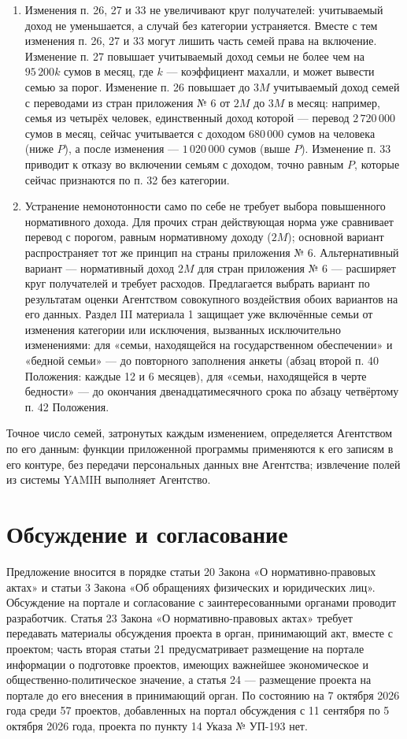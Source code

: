\documentclass[14pt,a4paper]{extarticle}
\begin{document}
\begin{enumerate}[leftmargin=1.27cm]
\item Изменения п. 26, 27 и 33 не увеличивают круг получателей: учитываемый доход не уменьшается, а случай без категории устраняется. Вместе с тем изменения п. 26, 27 и 33 могут лишить часть семей права на включение. Изменение п. 27 повышает учитываемый доход семьи не более чем на $95\,200k$ сумов в месяц, где $k$ — коэффициент махалли, и может вывести семью за порог. Изменение п. 26 повышает до $3M$ учитываемый доход семей с переводами из стран приложения № 6 от $2M$ до $3M$ в месяц: например, семья из четырёх человек, единственный доход которой — перевод $2\,720\,000$ сумов в месяц, сейчас учитывается с доходом $680\,000$ сумов на человека (ниже $P$), а после изменения — $1\,020\,000$ сумов (выше $P$). Изменение п. 33 приводит к отказу во включении семьям с доходом, точно равным $P$, которые сейчас признаются по п. 32 без категории.
\item Устранение немонотонности само по себе не требует выбора повышенного нормативного дохода. Для прочих стран действующая норма уже сравнивает перевод с порогом, равным нормативному доходу ($2M$); основной вариант распространяет тот же принцип на страны приложения № 6. Альтернативный вариант — нормативный доход $2M$ для стран приложения № 6 — расширяет круг получателей и требует расходов. Предлагается выбрать вариант по результатам оценки Агентством совокупного воздействия обоих вариантов на его данных. Раздел III материала 1 защищает уже включённые семьи от изменения категории или исключения, вызванных исключительно изменениями: для «семьи, находящейся на государственном обеспечении» и «бедной семьи» — до повторного заполнения анкеты (абзац второй п. 40 Положения: каждые 12 и 6 месяцев), для «семьи, находящейся в черте бедности» — до окончания двенадцатимесячного срока по абзацу четвёртому п. 42 Положения.
\end{enumerate}
Точное число семей, затронутых каждым изменением, определяется Агентством по его данным: функции приложенной программы применяются к его записям в его контуре, без передачи персональных данных вне Агентства; извлечение полей из системы YAMIH выполняет Агентство.

\section{Обсуждение и согласование}
Предложение вносится в порядке статьи 20 Закона «О нормативно-правовых актах» и статьи 3 Закона «Об обращениях физических и юридических лиц». Обсуждение на портале и согласование с заинтересованными органами проводит разработчик. Статья 23 Закона «О нормативно-правовых актах» требует передавать материалы обсуждения проекта в орган, принимающий акт, вместе с проектом; часть вторая статьи 21 предусматривает размещение на портале информации о подготовке проектов, имеющих важнейшее экономическое и общественно-политическое значение, а статья 24 — размещение проекта на портале до его внесения в принимающий орган\cite{orq682}. По состоянию на 7 октября 2026 года среди 57 проектов, добавленных на портал обсуждения с 11 сентября по 5 октября 2026 года, проекта по пункту 14 Указа № УП-193 нет\cite{portal}.
\end{document}
